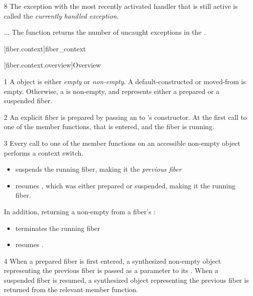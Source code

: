 8 The exception with the most recently activated handler
 that is still active is called the
\emph{currently handled exception}.


... The function 
returns the number of uncaught exceptions in the
.


\setcounter{section}{33}
\setcounter{subsection}{11}
\setcounter{secnumdepth}{4}

\cbstart

[fiber.context]{fiber\_context}

[fiber.context.overview]{Overview}

1 A \fiber object is either \emph{empty} or \emph{non-empty}. A
default-constructed or moved-from \fiber is empty. Otherwise, a \fiber is
non-empty, and represents either a prepared or a suspended fiber.

2 An explicit fiber is prepared by passing an \emph{\entryfn} to \fiber's
constructor. At the first call to one of the \anyresume member functions,
that \entryfn is entered, and the fiber is running.

3 Every call to one of the \anyresume member functions on an accessible
non-empty \fiber object performs a context switch.
\begin{itemize}
    \item suspends the running fiber, making it the \emph{previous fiber}
    \item resumes \thisfiber, which was either prepared or suspended, making
          it the running fiber.
\end{itemize}
In addition, returning a non-empty \fiber from a fiber's \entryfn:
\begin{itemize}
    \item terminates the running fiber
    \item resumes .
\end{itemize}

4 When a prepared fiber is first entered, a synthesized non-empty \fiber
object representing the previous fiber is passed as a parameter to
its \entryfn. When a suspended fiber is resumed, a synthesized \fiber object
representing the previous fiber is returned from the relevant \anyresume
member function.

